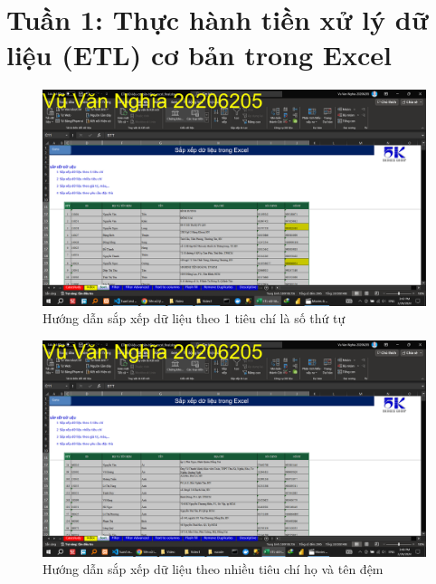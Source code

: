 \documentclass{article}
\begin{document}
\listoffigures
\section{Tuần 1: Thực hành tiền xử lý dữ liệu (ETL) cơ bản trong Excel}
\begin{figure}[h]
    \centering
    \includegraphics[scale = 0.15]{Video1/HuongDan/1.png}
    \caption{Hướng dẫn sắp xếp dữ liệu theo 1 tiêu chí là số thứ tự}
\end{figure}
\begin{figure}[h]
    \centering
    \includegraphics[scale = 0.15]{Video1/HuongDan/2.png}
    \caption{Hướng dẫn sắp xếp dữ liệu theo nhiều tiêu chí họ và tên đệm}
\end{figure}
\end{document}
